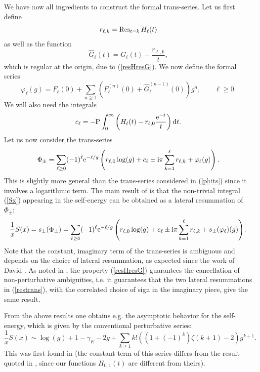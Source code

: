 \documentclass[a4paper,11pt]{article}
\theoremstyle{definition}
\newcommand{\re}{{\rm e}}
\newcommand{\ri}{{\rm i}}
\newcommand{\rd}{{\rm d}}
\newcommand{\be}{\begin{equation}}
\newcommand{\ee}{\end{equation}}
\begin{document}
We have now all ingredients to construct the formal trans-series. Let us first define 
%
\be
r_{\ell,k} = {\rm Res}_{t=k} \, H_\ell(t)
\ee
%
as well as the function 
%
\be
\widehat G_\ell(t)= G_\ell(t) - \frac{r_{\ell,0}}{t},
\ee
%
which is regular at the origin, due to (\ref{resHresG}). We now define the formal series
%
\be
\label{sigma-trans}
\varphi_\ell(g)= F_\ell (0)+ \sum_{n\ge 1} \left( F_\ell^{(n)}(0) + \widehat G_\ell^{(n-1)}(0)  \right) g^{n}, \qquad \ell \ge 0. 
 \ee
 We will also need the integrals
%
\begin{equation}
c_\ell = -{\rm{P}} \int_0^\infty \left( H_\ell(t) -r_{\ell,0} \frac{ \re^{-t}}{t} \right) \rd t.
\end{equation}
%
Let us now consider the trans-series 
%
\be
\label{beneke-ts}
\Phi_\pm =\sum_{\ell \ge 0} (-1)^\ell \re^{-\ell/g} \left( r_{\ell,0}\log(g) + c_\ell  \pm \ri\pi \sum_{k=1}^\ell r_{\ell,k} + \varphi_\ell (g)  \right). 
\ee
%
This is slightly more general than the trans-series considered in (\ref{phits}) since it involves a logarithmic term. The 
main result of \cite{beneke-braun} is that the non-trivial integral (\ref{Sx}) appearing in the self-energy can be obtained 
as a lateral resummation of $\Phi_\pm$:
%
\begin{equation}
\label{restrans}
{1\over x} S(x) =s_\pm (\Phi_\pm)= \sum_{\ell \ge 0} (-1)^\ell \re^{-\ell/g} \left( r_{\ell,0}\log(g) + c_\ell  \pm \ri\pi \sum_{k=1}^\ell r_{\ell,k} + s_\pm (\varphi_\ell)(g) \right).
\end{equation}
%
Note that the constant, imaginary term of the trans-series is ambiguous and 
depends on the choice of lateral resummation, 
as expected since the work of David \cite{david2,david3}. As noted in \cite{beneke-braun}, 
the property (\ref{resHresG}) guarantees the cancellation of non-perturbative ambiguities, i.e. 
it guarantees that the two lateral resummations in (\ref{restrans}), with the correlated choice of sign in the 
imaginary piece, give the same result. 

From the above results one obtains e.g. the asymptotic behavior for the self-energy, which is given by the conventional perturbative series:
%
\be
\frac{1}{x}S(x) \sim \log(g) + 1 - \gamma_E -2 g +  \sum_{k \ge 1 }k! \left( \left(1+(-1)^k\right)\zeta(k+1) - 2 \right) g^{k+1}. 
\ee
%
This was first found in \cite{cr-dr} (the constant term of this series differs from the result quoted in \cite{beneke-braun}, 
since our functions $H_{0,1}(t)$ are different from theirs).
\end{document}
